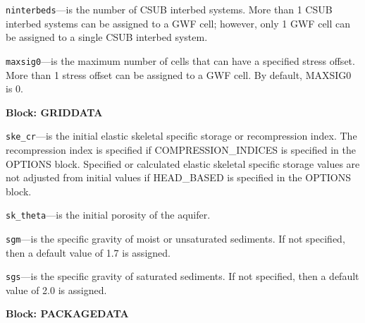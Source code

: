 \begin{description}
\item \texttt{ninterbeds}---is the number of CSUB interbed systems.  More than 1 CSUB interbed systems can be assigned to a GWF cell; however, only 1 GWF cell can be assigned to a single CSUB interbed system.

\item \texttt{maxsig0}---is the maximum number of cells that can have a specified stress offset.  More than 1 stress offset can be assigned to a GWF cell. By default, MAXSIG0 is 0.

\end{description}
\item \textbf{Block: GRIDDATA}

\begin{description}
\item \texttt{ske\_cr}---is the initial elastic skeletal specific storage or recompression index. The recompression index is specified if COMPRESSION\_INDICES is specified in the OPTIONS block.  Specified or calculated elastic skeletal specific storage values are not adjusted from initial values if HEAD\_BASED is specified in the OPTIONS block.

\item \texttt{sk\_theta}---is the initial porosity of the aquifer.

\item \texttt{sgm}---is the specific gravity of moist or unsaturated sediments.  If not specified, then a default value of 1.7 is assigned.

\item \texttt{sgs}---is the specific gravity of saturated sediments. If not specified, then a default value of 2.0 is assigned.

\end{description}
\item \textbf{Block: PACKAGEDATA}

